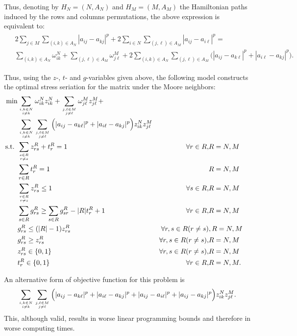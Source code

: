 \documentclass[a4paper,11pt, reqno]{amsart}
\newcommand{\dsum}{\displaystyle\sum}
\begin{document}
Thus, denoting by $H_N=(N,A_N)$ and $H_M=(M,A_M)$ the Hamiltonian paths induced by the rows and columns permutations, the above expression is equivalent to:
\begin{eqnarray*}
\begin{split}
& 2 \sum_{j\in M} \sum_{(i,k) \in A_N} |a_{ij} - a_{kj}|^p + 
2  \sum_{i\in N}\sum_{(j,\ell) \in A_M} |a_{ij} - a_{i\ell}|^p = \\
& \sum_{(i,k) \in A_N} \omega_{ik}^N + \sum_{(j,\ell) \in A_M} \omega^M_{j\ell} + 
2 \dsum_{(i,k) \in A_N} \sum_{(j,\ell) \in A_M} \Big(|a_{ij}-a_{k\ell}|^p + |a_{i\ell}-a_{kj}|^p \Big).
\end{split}
\end{eqnarray*}

Thus, using the $z$-, $t$- and $g$-variables given above, 
the following model constructs the optimal stress seriation for the matrix under the Moore neighbors:
\begin{align}
   \min & 
    \sum_{i,k \in N\atop i\neq k}       \omega^N_{ik} z^N_{ik} + 
    \sum_{j,\ell\in M\atop j\neq \ell } \omega^M_{j\ell } z^M_{j\ell } + \nonumber\\
    & \dsum_{i,k \in N\atop i\neq k} \sum_{j,\ell \in M\atop j\neq\ell } 
    \Big( |a_{ij}-a_{k\ell }|^p + |a_{i\ell }-a_{kj}|^p \Big) z^N_{ik} z^M_{j\ell } \label{tsp:obj12} \\
\mbox{s.t. } & \sum_{s\in R\atop r\neq s} z^R_{rs} + t^R_r = 1 & \forall r\in R, & R=N,M \label{tsp:11}\\
    & \sum_{r \in R} t^R_r = 1 && R=N,M \label{tsp:12} \\
    & \sum_{r\in R\atop r\neq s} z^R_{rs} \le 1 & \forall s\in R, & R=N,M\label{tsp:13}\\
    & \sum_{s\in R} g^R_{rs} \ge \sum_{s\in R} g^R_{sr}-|R|t^R_r+1 & \forall r\in R, & R=N,M \label{tsp:14}\\
    & g^R_{rs}\le (|R|-1)z^R_{rs} & \forall r,s \in R (r\neq s) &, R=N,M \label{tsp:15}\\
    & g^R_{rs} \ge z^R_{rs} & \forall r,s\in R (r\neq s), & R=N,M \label{tsp:16} \\
    & z^R_{rs} \in \{0,1\} & \forall r,s \in R (r\neq s), & R=N,M \label{tsp:17} \\
    & t^R_r \in \{0,1\} & \forall r\in R, & R=N,M. \label{tsp:18}
\end{align}


An alternative form of objective function for this problem is
$$ \dsum_{i, k \in N\atop i\neq k} \sum_{j,\ell \in M\atop j\neq \ell} \Big(
|a_{ij}-a_{k\ell}|^p + |a_{i\ell}-a_{kj}|^p + |a_{ij}-a_{i\ell}|^p + |a_{ij}-a_{kj}|^p \Big) z^N_{ik} z^M_{j\ell}.$$
This, although valid, results in worse linear programming bounds and therefore in worse computing times.
\end{document}
